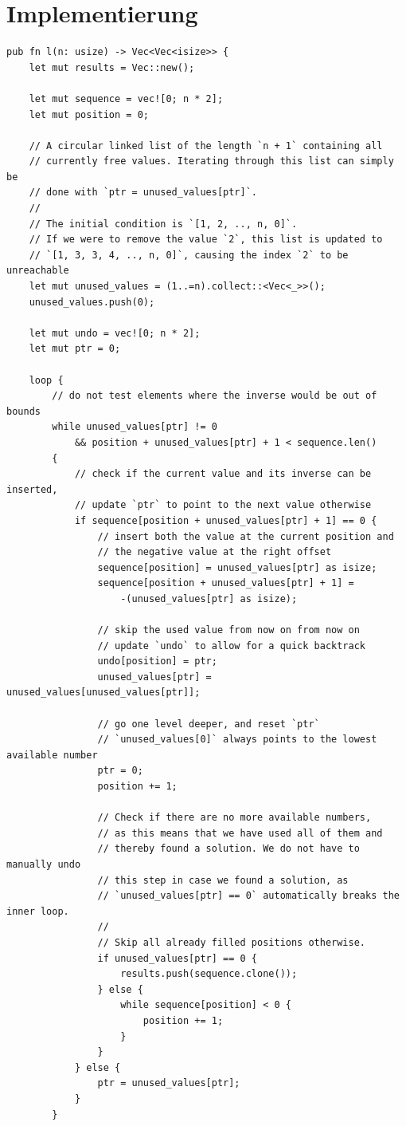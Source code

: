 \section{Implementierung}
\begin{verbatim}
pub fn l(n: usize) -> Vec<Vec<isize>> {
    let mut results = Vec::new();

    let mut sequence = vec![0; n * 2];
    let mut position = 0;

    // A circular linked list of the length `n + 1` containing all
    // currently free values. Iterating through this list can simply be
    // done with `ptr = unused_values[ptr]`.
    //
    // The initial condition is `[1, 2, .., n, 0]`.
    // If we were to remove the value `2`, this list is updated to
    // `[1, 3, 3, 4, .., n, 0]`, causing the index `2` to be unreachable
    let mut unused_values = (1..=n).collect::<Vec<_>>();
    unused_values.push(0);

    let mut undo = vec![0; n * 2];
    let mut ptr = 0;

    loop {
        // do not test elements where the inverse would be out of bounds
        while unused_values[ptr] != 0
            && position + unused_values[ptr] + 1 < sequence.len() 
        {
            // check if the current value and its inverse can be inserted,
            // update `ptr` to point to the next value otherwise
            if sequence[position + unused_values[ptr] + 1] == 0 {
                // insert both the value at the current position and
                // the negative value at the right offset
                sequence[position] = unused_values[ptr] as isize;
                sequence[position + unused_values[ptr] + 1] =
                    -(unused_values[ptr] as isize);

                // skip the used value from now on from now on
                // update `undo` to allow for a quick backtrack
                undo[position] = ptr;
                unused_values[ptr] = unused_values[unused_values[ptr]];

                // go one level deeper, and reset `ptr`
                // `unused_values[0]` always points to the lowest available number
                ptr = 0;
                position += 1;

                // Check if there are no more available numbers,
                // as this means that we have used all of them and
                // thereby found a solution. We do not have to manually undo
                // this step in case we found a solution, as 
                // `unused_values[ptr] == 0` automatically breaks the inner loop.
                //
                // Skip all already filled positions otherwise.
                if unused_values[ptr] == 0 {
                    results.push(sequence.clone());
                } else {
                    while sequence[position] < 0 {
                        position += 1;
                    }
                }
            } else {
                ptr = unused_values[ptr];
            }
        }


\end{verbatim}
